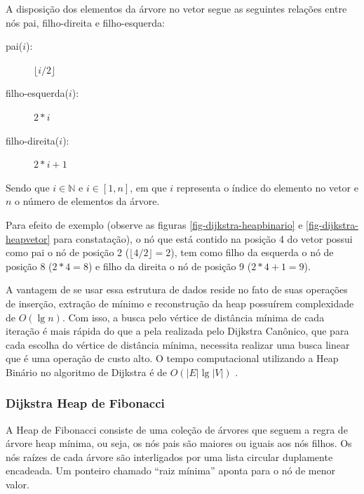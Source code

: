 A disposição dos elementos da árvore no vetor segue as seguintes relações entre nós pai, filho-direita e filho-esquerda:
\begin{description}
\item[pai($i$):] $\lfloor i/2 \rfloor$
\item[filho-esquerda($i$):] $2*i$
\item[filho-direita($i$):] $2*i+1$
\end{description}
Sendo que $i \in \mathbb{N}$ e $i \in [1, n]$, em que $i$ representa o índice do elemento no vetor e $n$ o número de elementos da árvore.

 Para efeito de exemplo (observe as figuras \ref{fig-dijkstra-heapbinario} e \ref{fig-dijkstra-heapvetor} para constatação), o nó que está contido na posição 4 do vetor possui como pai o nó de posição 2 ($\lfloor 4 / 2 \rfloor = 2$), tem como filho da esquerda o nó de posição 8 ($2*4 = 8$) e filho da direita o nó de posição 9 ($2*4+1 = 9$).


A vantagem de se usar essa estrutura de dados reside no fato de suas operações de inserção, extração de mínimo e reconstrução da heap possuírem complexidade de $O(\lg n)$. Com isso, a busca pelo vértice de distância mínima de cada iteração é mais rápida do que a pela realizada pelo Dijkstra Canônico, que para cada escolha do vértice de distância mínima, necessita realizar uma busca linear que é uma operação de custo alto. O tempo computacional utilizando a Heap Binário no algoritmo de Dijkstra é de $O(|E| \lg |V|)$ \cite{cormen2009introduction}.

\subsubsection{Dijkstra Heap de Fibonacci}
\label{sec-dijkstra-versoes-fibonacci}
A Heap de Fibonacci consiste de uma coleção de árvores que seguem a regra de árvore heap mínima, ou seja, os nós pais são maiores ou iguais aos nós filhos. Os nós raízes de cada árvore são interligados por uma lista circular duplamente encadeada. Um ponteiro chamado ``raiz mínima'' aponta para o nó de menor valor.

